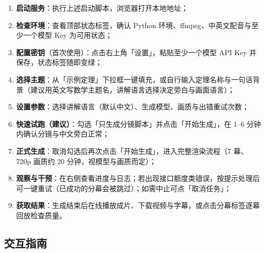 \documentclass[11pt,a4paper]{ctexart}
\begin{document}
\begin{enumerate}
  \item \textbf{启动服务}：执行上述启动脚本，浏览器打开本地地址；
  \item \textbf{检查环境}：查看顶部状态标签，确认 Python 环境、ffmpeg、中英文配音与至少一个模型 Key 为可用状态；
  \item \textbf{配置密钥}（首次使用）：点击右上角「设置」，粘贴至少一个模型 API Key 并保存，状态标签随即变绿；
  \item \textbf{选择主题}：从「示例定理」下拉框一键填充，或自行输入定理名称与一句话背景（建议用英文写数学主题名，讲解语言选择决定旁白与画面语言）；
  \item \textbf{设置参数}：选择讲解语言（默认中文）、生成模型、画质与出错重试次数；
  \item \textbf{快速试跑（建议）}：勾选「只生成分镜脚本」并点击「开始生成」，在 1--6 分钟内确认分镜与中文旁白正常；
  \item \textbf{正式生成}：取消勾选后再次点击「开始生成」，进入完整渲染流程（7 幕、720p 画质约 20 分钟，视模型与画质而定）；
  \item \textbf{观察与干预}：在右侧查看进度与日志；若出现接口额度类错误，按提示处理后可一键重试（已成功的分幕会被跳过）；如需中止可点「取消任务」；
  \item \textbf{获取结果}：生成结束后在线播放成片、下载视频与字幕，或点击分幕标签逐幕回放检查质量。
\end{enumerate}

\subsection{交互指南}
\end{document}

